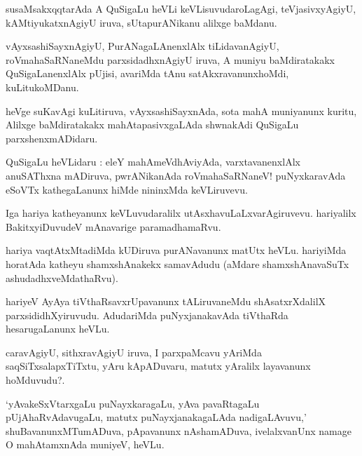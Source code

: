 \documentclass{article}
\begin{document}
\begin{mn}
susaMsakxqqtarAda A QuSigaLu heVLi keVLisuvudaroLagAgi, teVjasivxyAgiyU, 
kAMtiyukatxnAgiyU iruva, sUtapurANikanu alilxge baMdanu.
\end{mn}

\begin{mn}
vAyxsashiSayxnAgiyU, PurANagaLAnenxlAlx tiLidavanAgiyU, 
roVmahaSaRNaneMdu parxsidadhxnAgiyU iruva, A muniyu baMdiratakakx 
QuSigaLanenxlAlx pUjisi, avariMda tAnu satAkxravanunxhoMdi, 
kuLitukoMDanu.
\end{mn}

\begin{mn}
heVge suKavAgi kuLitiruva, vAyxsashiSayxnAda, sota mahA muniyanunx 
kuritu, Alilxge baMdiratakakx mahAtapasivxgaLAda shwnakAdi QuSigaLu 
parxshenxmADidaru.
\end{mn}

\begin{mn}
QuSigaLu heVLidaru : eleY mahAmeVdhAviyAda, varxtavanenxlAlx anuSAThxna 
mADiruva, pwrANikanAda roVmahaSaRNaneV!  puNyxkaravAda eSoVTx kathegaLanunx 
hiMde nininxMda keVLiruvevu.
\end{mn}

\begin{mn}
Iga hariya katheyanunx keVLuvudaralilx utAsxhavuLaLxvarAgiruvevu. 
hariyalilx BakitxyiDuvudeV mAnavarige paramadhamaRvu.
\end{mn}

\begin{mn}
hariya vaqtAtxMtadiMda kUDiruva purANavanunx matUtx heVLu. hariyiMda 
horatAda katheyu shamxshAnakekx samavAdudu (aMdare shamxshAnavaSuTx ashudadhxveMdathaRvu).
\end{mn}

\begin{mn}
hariyeV AyAya tiVthaRsavxrUpavanunx tALiruvaneMdu shAsatxrXdalilX parxsididhXyiruvudu. 
AdudariMda puNyxjanakavAda tiVthaRda hesarugaLanunx heVLu.
\end{mn}

\begin{mn}
caravAgiyU, sithxravAgiyU iruva, I parxpaMcavu yAriMda saqSiTxsalapxTiTxtu, yAru kApADuvaru, 
matutx yAralilx layavanunx hoMduvudu?.
\end{mn}

\begin{mn}
`yAvakeSxVtarxgaLu puNayxkaragaLu, yAva pavaRtagaLu pUjAhaRvAdavugaLu, matutx 
puNayxjanakagaLAda nadigaLAvuvu,' shuBavanunxMTumADuva, pApavanunx nAshamADuva, 
ivelalxvanUnx namage O mahAtamxnAda muniyeV, heVLu.
\end{mn}
\end{document}
